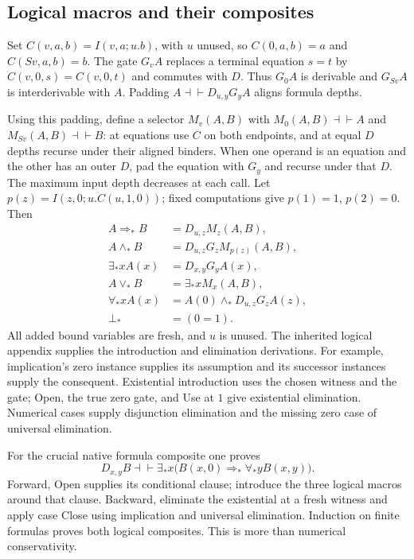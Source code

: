 \documentclass[11pt]{article}
\theoremstyle{definition}
\begin{document}
\subsection{Logical macros and their composites}

Set $C(v,a,b)=I(v,a;u.b)$, with $u$ unused, so $C(0,a,b)=a$ and
$C(Sv,a,b)=b$. The gate $G_v A$ replaces a terminal equation $s=t$ by
$C(v,0,s)=C(v,0,t)$ and commutes with $D$. Thus $G_0A$ is derivable and
$G_{Sv}A$ is interderivable with $A$. Padding
$A\dashv\vdash D_{u,y}G_yA$ aligns formula depths.

Using this padding, define a selector $M_v(A,B)$ with
$M_0(A,B)\dashv\vdash A$ and $M_{Sv}(A,B)\dashv\vdash B$:
at equations use $C$ on both endpoints, and at equal $D$ depths recurse
under their aligned binders. When one operand is an equation and the other
has an outer $D$, pad the equation with $G_y$ and recurse under that $D$.
The maximum input depth decreases at each call. Let
$p(z)=I(z,0;u.C(u,1,0))$; fixed computations give $p(1)=1$, $p(2)=0$.
Then
\[
\begin{aligned}
 A\Rightarrow_*B&=D_{u,z}M_z(A,B),\\
 A\wedge_*B&=D_{u,z}G_zM_{p(z)}(A,B),\\
 \exists_*x A(x)&=D_{x,y}G_yA(x),\\
 A\vee_*B&=\exists_*x M_x(A,B),\\
 \forall_*x A(x)&=A(0)\wedge_*D_{u,z}G_zA(z),\\
 \bot_*&=(0=1).
\end{aligned}
\]
All added bound variables are fresh, and $u$ is unused. The inherited
logical appendix supplies the introduction and elimination derivations.
For example, implication's zero instance supplies its assumption and its
successor instances supply the consequent. Existential introduction uses
the chosen witness and the gate; Open, the true zero gate, and Use at $1$
give existential elimination. Numerical cases supply disjunction
elimination and the missing zero case of universal elimination.

For the crucial native formula composite one proves
\[
 D_{x,y}B\dashv\vdash
 \exists_*x\bigl(B(x,0)\Rightarrow_*\forall_*y B(x,y)\bigr).
\]
Forward, Open supplies its conditional clause; introduce the three logical
macros around that clause. Backward, eliminate the existential at a fresh
witness and apply case Close using implication and universal elimination.
Induction on finite formulas proves both logical composites. This is more
than numerical conservativity.
\end{document}
